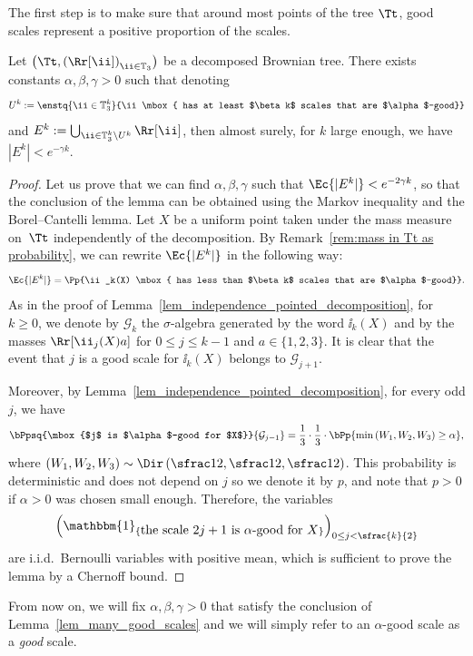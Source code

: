 The first step is to make sure that around most points of the tree $\Tt$, good scales represent a positive proportion of the scales.
\begin{lemma}\label{lem_many_good_scales}
Let $\left( \Tt, \left( \Rr[\ii] \right)_{\ii \in \mathbb{T}_3} \right)$ be a decomposed Brownian tree.
There exists constants $\alpha, \beta, \gamma>0$ such that denoting
\begin{align*}
U^k:= \enstq{\ii \in \mathbb{T}_3^k}{\ii \mbox{ has at least $\beta k$ scales that are $\alpha$-good}}
\end{align*}
and $E^k:=\bigcup_{\ii \in \mathbb{T}_3^k \backslash U^k} \Rr[\ii]$, then almost surely, for $k$ large enough, we have
$|E^k| < e^{-\gamma k }$.
\end{lemma}

\begin{proof}
Let us prove that we can find $\alpha,\beta,\gamma$ such that $\Ec{|E^k|}<e^{-2\gamma k}$, so that the conclusion of the lemma can be obtained using the Markov inequality and the Borel--Cantelli lemma.
Let $X$ be a uniform point taken under the mass measure on~$\Tt$ independently of the decomposition.
By Remark~\ref{rem:mass in Tt as probability}, we can rewrite $\Ec{|E^k|}$ in the following way:
\begin{align*}
\Ec{|E^k|}
= \Pp{\ii_k(X) \mbox{ has less than $\beta k$ scales that are $\alpha$-good}}.
\end{align*}
As in the proof of Lemma~\ref{lem_independence_pointed_decomposition}, for $k \geq 0$, we denote by $\mathcal{G}_k$ the $\sigma$-algebra generated by the word $\ii_k(X)$ and by the masses $\Rr[\ii_j (X) a]$ for $0 \leq j \leq k-1$ and $a \in \{1,2,3\}$. It is clear that the event that $j$ is a good scale for $\ii_k(X)$ belongs to $\mathcal{G}_{j+1}$.

Moreover, by Lemma~\ref{lem_independence_pointed_decomposition}, for every odd $j$, we have
\begin{align} \label{eq:probability that next scale is good}
\bPpsq{\mbox{$j$ is $\alpha$-good for $X$}}{ \mathcal{G}_{j-1}} = \frac{1}{3} \cdot \frac{1}{3} \cdot \bPp{ \min \left( W_1, W_2, W_3 \right) \geq \alpha},
\end{align}
where $(W_1,W_2,W_3) \sim \Dir \left( \sfrac12, \sfrac12, \sfrac12 \right)$.
This probability is deterministic and does not depend on $j$ so we denote it by $p$, and note that $p>0$ if $\alpha>0$ was chosen small enough.
Therefore, the variables
\begin{align*}
\left( \mathbbm{1}_{\{\mbox{the scale $2j+1$ is $\alpha$-good for $X$}\}} \right)_{0 \leq j < \sfrac{k}{2}}
\end{align*}
are i.i.d.\ Bernoulli variables with positive mean, which is sufficient to prove the lemma by a Chernoff bound.
\end{proof}
From now on, we will fix $\alpha, \beta, \gamma>0$ that satisfy the conclusion of Lemma~\ref{lem_many_good_scales} and we will simply refer to an $\alpha$-good scale as a \emph{good} scale.

